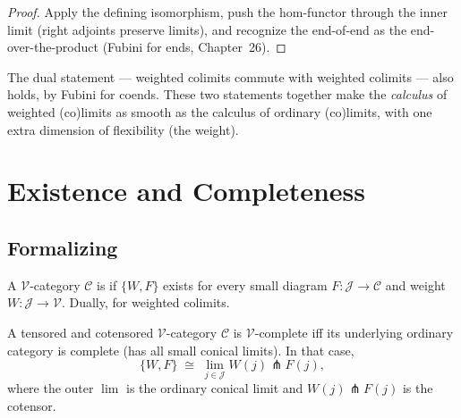\begin{proof}
Apply the defining isomorphism, push the hom-functor through the inner
limit (right adjoints preserve limits), and recognize the end-of-end as the
end-over-the-product (Fubini for ends, Chapter~26).
\end{proof}

\begin{remark}
The dual statement — weighted colimits commute with weighted colimits — also
holds, by Fubini for coends. These two statements together make the
\emph{calculus} of weighted (co)limits as smooth as the calculus of ordinary
(co)limits, with one extra dimension of flexibility (the weight).
\end{remark}


\section{Existence and Completeness}
\label{sec:wlim-completeness}

\subsection{Formalizing}

\begin{definition}
\label{def:wcomplete}
A $\mathcal{V}$-category $\mathcal{C}$ is  if
$\{W, F\}$ exists for every small diagram $F : \mathcal{J} \to \mathcal{C}$
and weight $W : \mathcal{J} \to \mathcal{V}$. Dually, 
for weighted colimits.
\end{definition}

\begin{theorem}
\label{thm:wcomplete-from-pieces}
A tensored and cotensored $\mathcal{V}$-category $\mathcal{C}$ is
$\mathcal{V}$-complete iff its underlying ordinary category is complete (has
all small conical limits). In that case,
\begin{equation*}
  \{W, F\} \;\cong\; \lim_{j \in \mathcal{J}} W(j) \pitchfork F(j),
\end{equation*}
where the outer $\lim$ is the ordinary conical limit and $W(j) \pitchfork F(j)$
is the cotensor.
\end{theorem}

